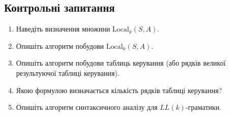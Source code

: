 \subsection{Контрольні запитання}
\begin{enumerate}
	\item Наведіть визначення множини $\text{Local}_k(S, A)$.
	\item Опишіть алгоритм побудови $\text{Local}_k(S, A)$.
	\item Опишіть алгоритм побудови таблиць керування (або рядків великої результуючої таблиці керування).
	\item Якою формулою визначається кількість рядків таблиці керування?
	\item Опишіть алгоритм синтаксичного аналізу для $LL(k)$-граматики.
\end{enumerate}
